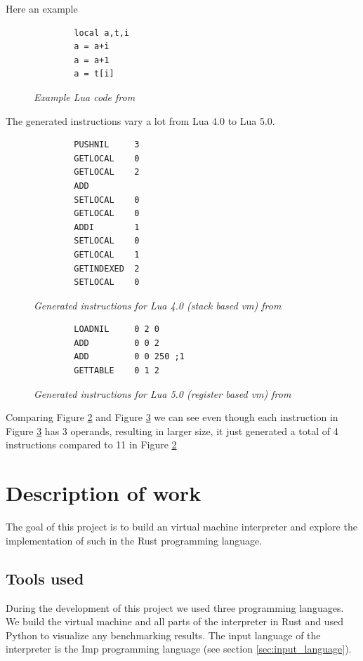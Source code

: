 \documentclass{article}
\begin{document}
Here an example

\begin{figure}[ht]
    \begin{verbatim}
        local a,t,i
        a = a+i
        a = a+1
        a = t[i]
    \end{verbatim}
    \caption{\textit{Example Lua code from ~\cite{lua_implementation}}}
    \label{fig:lua_code}
\end{figure}

The generated instructions vary a lot from Lua 4.0 to Lua 5.0.

\begin{figure}[ht]
    \begin{verbatim}
        PUSHNIL     3
        GETLOCAL    0
        GETLOCAL    2
        ADD
        SETLOCAL    0
        GETLOCAL    0
        ADDI        1
        SETLOCAL    0
        GETLOCAL    1
        GETINDEXED  2
        SETLOCAL    0
    \end{verbatim}
    \caption{\textit{Generated instructions for Lua 4.0 (stack based vm) from ~\cite{lua_implementation}}}
    \label{fig:lua_generated4}
\end{figure}


\begin{figure}[ht]
    \begin{verbatim}
        LOADNIL     0 2 0
        ADD         0 0 2
        ADD         0 0 250 ;1
        GETTABLE    0 1 2
    \end{verbatim}
    \caption{\textit{Generated instructions for Lua 5.0 (register based vm) from ~\cite{lua_implementation}}}
    \label{fig:lua_generated5}
\end{figure}

Comparing Figure \ref{fig:lua_generated4} and Figure \ref{fig:lua_generated5}
we can see even though each instruction in Figure \ref{fig:lua_generated5} has 3 operands,
resulting in larger size, it just generated a total of 4 instructions compared
to 11 in Figure \ref{fig:lua_generated4}

\section{Description of work}
The goal of this project is to build an virtual machine interpreter and 
explore the implementation of such in the Rust programming language.

\subsection{Tools used}
During the development of this project we used three programming languages. We
build the virtual machine and all parts of the interpreter in Rust and used
Python to visualize any benchmarking results. The input language of the
interpreter is the Imp programming language (see section
\ref{sec:input_language}). ~\cite{Pierce:SF1}
\end{document}
